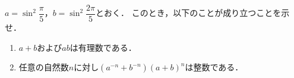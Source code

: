 \documentclass[../../main.tex]{subfiles}
\begin{document}
$\displaystyle a=\sin^2\dfrac{\pi}{5}$，$\displaystyle b=\sin^2\dfrac{2\pi}{5}$とおく．
このとき，以下のことが成り立つことを示せ．
\begin{enumerate}
  \item $a+b$および$ab$は有理数である．
  \item 任意の自然数$n$に対し$(a^{-n}+b^{-n}){(a+b)}^n$は整数である．
\end{enumerate}
\end{document}
